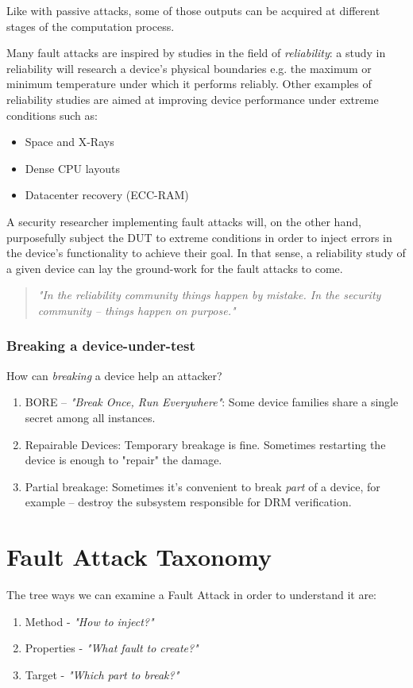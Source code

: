 Like with passive attacks, some of those outputs can be acquired at different stages of the computation process.

Many fault attacks are inspired by studies in the field of \emph{reliability}: a study in reliability will research a device's physical boundaries e.g. the maximum or minimum temperature under which it performs reliably. Other examples of reliability studies are aimed at improving device performance under extreme conditions such as:
\begin{itemize}
	\item Space and X-Rays
	\item Dense CPU layouts
	\item Datacenter recovery (ECC-RAM)
\end{itemize}

A security researcher implementing fault attacks will, on the other hand,  purposefully subject the DUT to extreme conditions in order to inject errors in the device's functionality to achieve their goal. In that sense, a reliability study of a given device can lay the ground-work for the fault attacks to come.

\begin{quote}
    \textit{"In the reliability community things happen by mistake. In the security community -- things happen on purpose."}
\end{quote}

\subsubsection*{Breaking a device-under-test}
How can \emph{breaking} a device help an attacker?

\begin{enumerate}
    \item BORE -- \textit{"Break Once, Run Everywhere"}: Some device families share a single secret among all instances.
    \item Repairable Devices: Temporary breakage is fine. Sometimes restarting the device is enough to "repair" the damage.
    \item Partial breakage: Sometimes it's convenient to break \emph{part} of a device, for example -- destroy the subsystem responsible for DRM verification.
\end{enumerate}

\section{Fault Attack Taxonomy}
The tree ways we can examine a Fault Attack in order to understand it are:
\begin{enumerate}
	\item Method - \emph{"How to inject?"}
	\item Properties - \emph{"What fault to create?"}
	\item Target - \emph{"Which part to break?"}
\end{enumerate}

